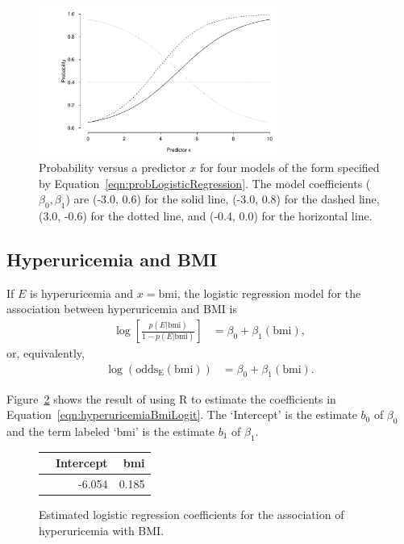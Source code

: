 \begin{figure}[!htb]
	\centering
	\includegraphics[width=0.70\textwidth]
	{ch_logistic_regression_oi_biostat/figures/probVsPredictor/probVsPredictor.pdf}
    \caption{Probability versus a predictor $x$ for four models of the form specified by Equation~\ref{eqn:probLogisticRegression}. The model coefficients ($\beta_0, \beta_1$) are (-3.0, 0.6) for the solid line, (-3.0, 0.8) for the dashed line, (3.0, -0.6) for the dotted line, and (-0.4, 0.0) for the horizontal line.}
    \label{figure:probVsPredictor}
\end{figure}


\subsection{Hyperuricemia and BMI}
\label{section:analyzingHyperuricemia}

If $E$ is hyperuricemia and $x = \text{bmi}$, the logistic regression model for the association between hyperuricemia and BMI is
\begin{align*}
  \log\left[\frac{p(E|\text{bmi})}{1-p(E|\text{bmi})}\right] &=  \beta_0 + \beta_1 (\text{bmi}),
\end{align*}
or, equivalently,
\begin{align}
  \log(\text{odds}_\text{E}(\text{bmi})) &=  \beta_0 + \beta_1 (\text{bmi}).
   \label{eqn:hyperuricemiaBmiLogit}
\end{align}

Figure~\ref{figure:bmiHyperuricemiaLogRegCoeff} shows the result of using \textsf{R} to estimate the coefficients in Equation~\ref{eqn:hyperuricemiaBmiLogit}.  The `Intercept' is the estimate $b_0$  of $\beta_0$ and the term labeled `bmi' is the estimate $b_1$ of $\beta_1$.

\begin{figure}[ht]
\centering
\begin{tabular}{rrr}
  \hline
 & Intercept & bmi  \\
  \hline
 & -6.054 & 0.185  \\
   \hline
\end{tabular}
\caption{Estimated logistic regression coefficients for the association of hyperuricemia with BMI.}
\label{figure:bmiHyperuricemiaLogRegCoeff}
\end{figure}

